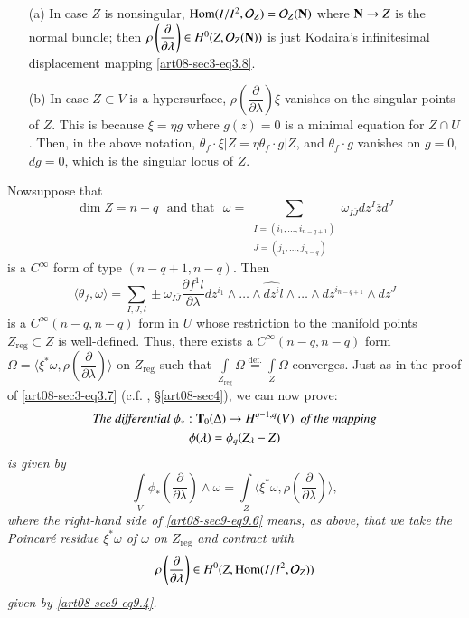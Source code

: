 \begin{examples*}
\begin{itemize}
\item[(a)] In case $Z$ is nonsingular, $\operatorname{\mathrm{Hom}}(I/I^{2},\mathcal{O}_{Z})=\mathcal{O}_{Z}(\mathbf{N})$ where $\mathbf{N}\to Z$ is the normal bundle; then $\rho\left(\dfrac{\partial}{\partial\lambda}\right)\in H^{0}(Z,\mathcal{O}_{Z}(\mathbf{N}))$ is just Kodaira's infinitesimal displacement mapping \eqref{art08-sec3-eq3.8}.

\item[(b)] In case $Z\subset V$ is a hypersurface, $\rho\left(\dfrac{\partial}{\partial\lambda}\right)\xi$ vanishes on the singular points of $Z$. This is because $\xi=\eta g$ where $g(z)=0$ is a minimal equation for $Z\cap U$. Then, in the above notation, $\theta_{f}\cdot \xi|Z=\eta\theta_{f}\cdot g|Z$, and $\theta_{f}\cdot g$ vanishes on $g=0$, $dg=0$, which is the singular locus of $Z$.
\end{itemize}
\end{examples*}

Now\pageoriginale suppose that 
$$
\dim Z=n-q\text{~ and that~ }\omega=\sum\limits_{\substack{I=(i_{1},\ldots,i_{n-q+1})\\ J=(j_{1},\ldots,j_{n-q})}}\omega_{I\overline{J}}dz^{I}\overline{z}d^{J}
$$
is a $C^{\infty}$ form of type $(n-q+1,n-q)$. Then
$$
\langle \theta_{f},\omega\rangle = \sum\limits_{I,J,l}\pm \omega_{I\overline{J}}\dfrac{\partial f^{1}l}{\partial \lambda}dz^{i_{1}}\wedge\ldots\wedge \widehat{dz^{i}}l\wedge\ldots\wedge dz^{i_{n-q+1}}\wedge d\overline{z}^{J}
$$
is a $C^{\infty}(n-q,n-q)$ form in $U$ whose restriction to the manifold points $Z_{\text{reg}}\subset Z$ is well-defined. Thus, there exists a $C^{\infty}(n-q,n-q)$ form $\Omega=\langle \xi^{*}\omega,\rho\left(\dfrac{\partial}{\partial\lambda}\right)\rangle$ on $Z_{\text{reg}}$ such that $\int\limits_{Z_{\text{reg}}}\Omega\displaystyle{\mathop{=}\limits^{\text{def.}}}\int\limits_{Z}\Omega$ converges. Just as in the proof of \eqref{art08-sec3-eq3.7} (c.f. \cite{art08-key9}, \S\ref{art08-sec4}), we can now prove:
\begin{gather}
\text{\em The differential } \phi_{*}:\mathbf{T}_{0}(\Delta)\to H^{q-1,q}(V) \text{\em ~ of the mapping}\notag\\
\phi(\lambda)=\phi_{q}(Z_{\lambda}-Z)\label{art08-sec9-eq9.5}
\end{gather}
{\em is given by}
\begin{equation}
\int\limits_{V}\phi_{*}\left(\dfrac{\partial}{\partial \lambda}\right)\wedge\omega=\int\limits_{Z}\langle \xi^{*}\omega, \rho\left(\dfrac{\partial}{\partial\lambda}\right)\rangle,\label{art08-sec9-eq9.6}
\end{equation}
{\em where the right-hand side of \eqref{art08-sec9-eq9.6} means, as above, that we take the Poincar\'e residue $\xi^{*}\omega$ of $\omega$ on $Z_{\text{reg}}$ and contract with 
$$
\rho\left(\dfrac{\partial}{\partial \lambda}\right)\in H^{0}(Z,\operatorname{\mathrm{Hom}}(I/I^{2},\mathcal{O}_{Z}))
$$ 
given by \eqref{art08-sec9-eq9.4}.}

